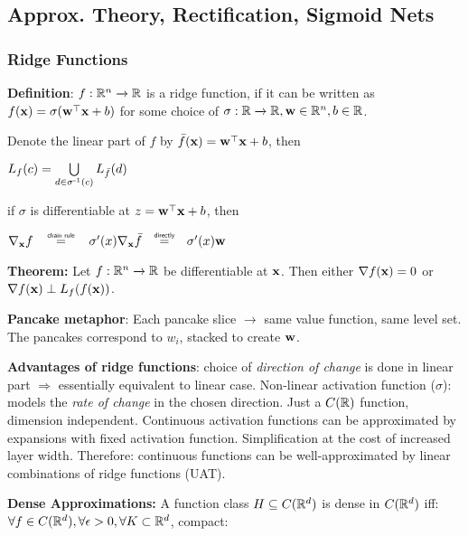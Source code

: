 \subsection{Approx. Theory, Rectification, Sigmoid Nets} %
\label{sub:approxtheory}

    \subsubsection{Ridge Functions} %
    \label{ssub:ridgefunctions}
        \textbf{Definition}: $f:\mathbb R^n\xrightarrow{}\mathbb R$ is a ridge function, if it can be written as $f(\mathbf x)=\sigma(\mathbf w^{\mathop{\mathrm{\top}}}\mathbf x+b)$ for some choice of $\sigma:\mathbb R\xrightarrow{}\mathbb R, \mathbf w\in\mathbb R^n, b\in\mathbb R$.
        
        Denote the linear part of $f$ by $\bar{f}(\mathbf x)=\mathbf w^{\mathop{\mathrm{\top}}}\mathbf x+b$, then
        
        \tab$L_f(c)=\bigcup\limits_{d\in\sigma^{\text{-}1}(c)}L_{\bar{f}}(d)$
        
        if $\sigma$ is differentiable at $z=\mathbf w^{\mathop{\mathrm{\top}}}\mathbf x+b$, then 
        
        $\nabla_\vx f \>\>\>\>\>\>\> \mathrel{\overset{\makebox[0pt]{\mbox{\normalfont\tiny\sffamily chain rule}}}{=}}\>\>\>\>\>\>\> \sigma'(x)\nabla_\vx\bar{f} \>\>\>\>\> \mathrel{\overset{\makebox[0pt]{\mbox{\normalfont\tiny\sffamily directly}}}{=}}\>\>\>\>\> \sigma'(x)\vw$
        
        \textbf{Theorem:} Let $f:\mathbb R^n\xrightarrow{}\mathbb R$ be differentiable at $\mathbf x$. Then either $\nabla f(\mathbf x)=0$ or $\nabla f(\mathbf x) \perp L_f(f(\mathbf x))$.
        
        \textbf{Pancake metaphor}: Each pancake slice $\xrightarrow{}$ same value function, same level set. The pancakes correspond to $w_i$, stacked to create $\mathbf w$.
        
        \textbf{Advantages of ridge functions}: choice of \emph{direction of change} is done in linear part $\Rightarrow$ essentially equivalent to linear case. Non-linear activation function ($\sigma$): models the \emph{rate of change} in the chosen direction. Just a $C(\mathbb R)$ function, dimension independent. Continuous activation functions can be approximated by expansions with fixed activation function. Simplification at the cost of increased layer width. Therefore: continuous functions can be well-approximated by linear combinations of ridge functions (UAT).
        
        \textbf{Dense Approximations:} A function class $H\subseteq C(\mathbb R^d)$ is dense in $C(\mathbb R^d)$ iff:
        $\forall f \in C(\mathbb R^d), \forall\epsilon>0, \forall K \subset\mathbb R^d$, compact: 
        
